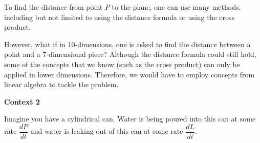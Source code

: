 \documentclass[12pt]{article}
\begin{document}
To find the distance from point $P$ to the plane, one can use many methods, including but not limited to using the distance formula or using the cross product. \par

\begin{center}
\end{center}

However, what if in 10-dimensions, one is asked to find the distance between a point and a 7-dimensional piece? Although the distance formula could still hold, some of the concepts that we know (such as the cross product) can only be applied in lower dimensions. Therefore, we would have to employ concepts from linear algebra to tackle the problem. 

\newpage

\textbf{Context 2}

Imagine you have a cylindrical can. Water is being poured into this can at some rate $\dfrac{dP}{dt}$ and water is leaking out of this can at some rate $\dfrac{dL}{dt}$. \par
\end{document}
